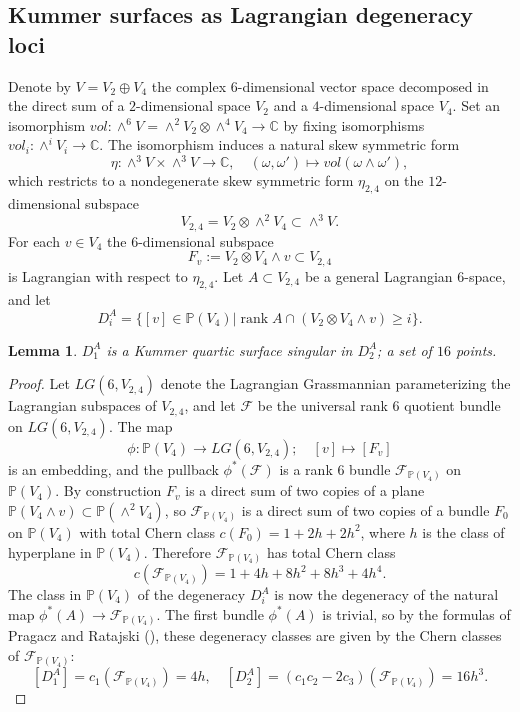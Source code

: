 \documentclass[a4paper,11pt]{amsart}
\newtheorem{lemma}[thm]{Lemma}
\theoremstyle{definition}
\numberwithin{equation}{section}
\numberwithin{equation}{section} \theoremstyle{definition}
\begin{document}
\subsection{Kummer surfaces as Lagrangian degeneracy loci}\label{lagrangiankummer} Denote by $V=V_2\oplus V_4$ the complex $6$-dimensional vector space decomposed in the direct sum of a $2$-dimensional space $V_2$ and a $4$-dimensional space $V_4$.
 Set an isomorphism  $vol: \wedge^6 V=\wedge^2 V_2\otimes \wedge^4 V_4 \to \mathbb{C}$ by fixing isomorphisms  $vol_i: \wedge^i V_i \to \mathbb{C}$.
The isomorphism induces a natural skew symmetric form
\begin{equation}\label{def of eta}\textstyle 
\eta: \wedge^3V\times \wedge^3 V\to \mathbb{C}, \quad 
(\omega,\omega')\mapsto vol(\omega\wedge \omega'),
 \end{equation} 
 which restricts to a nondegenerate skew symmetric form $\eta_{2,4}$ on the $12$-dimensional subspace 
 \[
 V_{2,4}=V_2\otimes \wedge^2 V_4\subset \wedge^3 V.
 \]
 For each $v\in V_4$ the $6$-dimensional subspace 
 \[
 F_v:=V_2\otimes V_4\wedge v\subset V_{2,4}
 \]
 is Lagrangian with respect to $\eta_{2,4}$.
 Let $A\subset V_{2,4}$ be a general Lagrangian $6$-space, and let 
 \[
 D_i^A=\{[v]\in {{\mathbb{P}}}(V_4)|\operatorname{rank} A\cap (V_2\otimes  V_4\wedge v)\geq i\}.
 \]
  \begin{lemma}\label{lagrangian Kummer} $D_1^A$ is a Kummer quartic surface singular in $D_2^A$; a set of $16$ points. 
 \end{lemma}
 \begin{proof}  Let $LG(6,V_{2,4})$ denote the Lagrangian Grassmannian parameterizing the Lagrangian subspaces of  $V_{2,4}$, and let ${\mathcal F}$ be the universal rank $6$ quotient bundle on $LG(6,V_{2,4})$.  The map 
 \[
 \phi: {{\mathbb{P}}}(V_4)\to LG(6,V_{2,4});\quad [v]\mapsto [F_v]
 \]
 is an embedding, and the pullback $\phi^*({\mathcal F})$ is a rank $6$ bundle ${\mathcal F}_{{{\mathbb{P}}}(V_4)}$ on ${{\mathbb{P}}}(V_4)$.
 By construction $F_v$ is a direct sum of two copies of a plane ${{\mathbb{P}}}(V_4\wedge v)\subset {{\mathbb{P}}}(\wedge^2 V_4)$, so ${\mathcal F}_{{{\mathbb{P}}}(V_4)}$ is a direct sum of two copies of a bundle $F_0$ on ${{\mathbb{P}}}(V_4)$ with total Chern class $c(F_0)=1+2h+2h^2$, where $h$ is the class of  hyperplane in ${{\mathbb{P}}}(V_4)$.  Therefore ${\mathcal F}_{{{\mathbb{P}}}(V_4)}$ has total Chern class
 \[
 c({\mathcal F}_{{{\mathbb{P}}}(V_4)})=1+4h+8h^2+8h^3+4h^4. 
\]
The class in ${{\mathbb{P}}}(V_4)$ of the degeneracy  $D_i^A$ is now the degeneracy of the natural map $\phi^*(A)\to { \mathcal F}_{{{\mathbb{P}}}(V_4)}$. 
 The first bundle $\phi^*(A)$ is trivial, so by the formulas of Pragacz and Ratajski (\cite[Theorem 2.1]{PragaczRatajski}), these degeneracy classes are given by the Chern classes of ${ \mathcal F}_{{{\mathbb{P}}}(V_4)}$:
\[
[D_1^A]= c_1({\mathcal F}_{{{\mathbb{P}}}(V_4)})=4h,\quad [D_2^A]= (c_1c_2-2c_3)({\mathcal F}_{{{\mathbb{P}}}(V_4)})=16h^3.
\]
 \end{proof}
\end{document}
